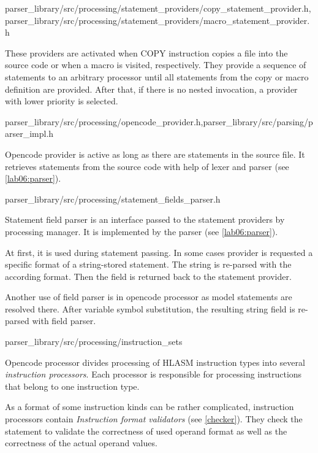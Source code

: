 {parser\_library/src/processing/statement\_providers/copy\_statement\_provider.h,parser\_library/src/processing/statement\_providers/macro\_statement\_provider.h}

These providers are activated when COPY instruction copies a file into the source code or when a macro is visited, respectively. They provide a sequence of statements to an arbitrary processor until all statements from the copy or macro definition are provided. After that, if there is no nested invocation, a provider with lower priority is selected.

{parser\_library/src/processing/opencode\_provider.h,parser\_library/src/parsing/parser\_impl.h}

Opencode provider is active as long as there are statements in the source file. It retrieves statements from the source code with help of lexer and parser (see \cref{lab06:parser}).

{parser\_library/src/processing/statement\_fields\_parser.h}
\label{lab06:field_parser}

Statement field parser is an interface passed to the statement providers by processing manager. It is implemented by the parser (see \cref{lab06:parser}).

At first, it is used during statement passing. In some cases provider is requested a specific format of a string-stored statement. The string is re-parsed with the according format. Then the field is returned back to the statement provider. 

Another use of field parser is in opencode processor as model statements are resolved there. After variable symbol substitution, the resulting string field is re-parsed with field parser.

{parser\_library/src/processing/instruction\_sets}
\label{lab06:instr_proc}

Opencode processor divides processing of HLASM instruction types into several \emph{instruction processors}. Each processor is responsible for processing instructions that belong to one instruction type.

As a format of some instruction kinds can be rather complicated, instruction processors contain \emph{Instruction format validators} (see \cref{checker}). They check the statement to validate the correctness of used operand format as well as the correctness of the actual operand values.

